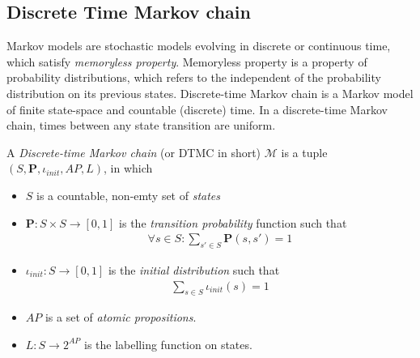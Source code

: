 \subsection{Discrete Time Markov chain}
Markov models are stochastic models evolving in discrete or continuous time, which satisfy
\textit{memoryless property}. Memoryless property is a property of probability distributions, which
refers to the independent of the probability distribution on its previous states. Discrete-time
Markov chain is a Markov model of finite state-space and countable (discrete) time. In a
discrete-time Markov chain, times between any state transition are uniform.
\begin{definition}
      \rm
      A \textit{Discrete-time Markov chain} (or DTMC in short) $\mathcal{M}$ is a tuple
      $(S,\mathbf{P}, \iota_{init}, AP, L)$, in which
      \begin{itemize}
            \item $S$ is a countable, non-emty set of \textit{states}
            \item $\mathbf{P}:S\times S \rightarrow [0,1]$ is the \textit{transition probability}
                  function such that
                  \begin{align*}
                        \forall s \in S : \sum_{s'\in S}\mathbf{P}(s, s') = 1
                  \end{align*}
            \item $\iota_{init}: S \rightarrow [0,1]$ is the \textit{initial distribution} such that
                  \begin{align*}
                        \sum_{s\in S} \iota_{init}(s) = 1
                  \end{align*}
            \item $AP$ is a set of \textit{atomic propositions}.
            \item $L: S \rightarrow 2^{AP}$ is the labelling function on states.
      \end{itemize}
\end{definition}


